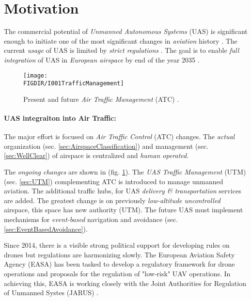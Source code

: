 \section{Motivation}\label{s:motivation}
\noindent The commercial potential of \emph{Unmanned Autonomous Systems} (UAS) is significant  enough to initiate one of the most significant changes in \emph{aviation} history \cite{airbusUTM2018blueprint}. The current \emph{usage} of UAS is limited by \emph{strict regulations} \cite{icao4444,icaoAnnex2,icaoAnnex11}. The goal is to enable \emph{full integration} of UAS in \emph{European airspace} by end of the year 2035 \cite{eurocontrol2018rpasatm}.


\begin{figure}[H]
    \centering
    \texttt{[image: \\FIGDIR/I001TrafficManagement]}
    \caption{Present and future \emph{Air Traffic Management} (ATC) \cite{airbusUTM2018blueprint}.}
    \label{fig:airTrafficManagementEvolution}
\end{figure}

\paragraph{UAS integraiton into Air Traffic:} The major effort is focused on \emph{Air Traffic Control} (ATC) changes. The \emph{actual} organization (sec. \ref{sec:AirspaceClassification}) and management (sec. \ref{sec:WellClear}) of airspace is centralized and \emph{human operated}.  

The \emph{ongoing changes} are shown in (fig. \ref{fig:airTrafficManagementEvolution}). The \emph{UAS Traffic Management} (UTM) (sec. \ref{sec:UTM}) complementing ATC is introduced to manage unmanned aviation. The additional traffic hubs, for UAS \emph{delivery \& transportation} services are added. The greatest change is on previously \emph{low-altitude uncontrolled} airspace, this space has new authority (UTM). The future UAS must implement mechanisms for \emph{event-based} navigation and avoidance (sec. \ref{sec:EventBasedAvoidance}).

Since 2014, there is a visible strong political support for developing rules on drones but regulations are harmonizing slowly. The European Aviation Safety Agency (EASA) has been tasked to develop a regulatory framework for drone operations and proposals for the regulation of "low-risk" UAV operations. In achieving this, EASA is working closely with the Joint Authorities for Regulation of Unmanned Systes (JARUS) \cite{jarus2016regulations}.

